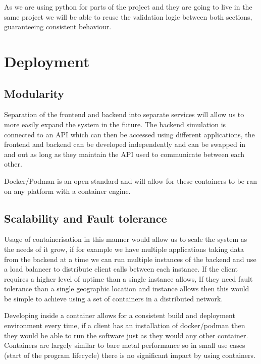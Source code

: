 \documentclass{article}
\begin{document}
As we are using python for parts of the project and they are going to live 
in the same project we will be able to reuse the validation logic between both 
sections, guaranteeing consistent behaviour.


\section{Deployment}

\subsection{Modularity}
Separation of the frontend and backend into separate services will allow us to more 
easily expand the system in the future. The backend simulation is connected to an API 
which can then be accessed using different applications, the frontend and backend can 
be developed independently and can be swapped in and out as long as they maintain the 
API used to communicate between each other.

Docker/Podman is an open standard and will allow for these containers to be ran 
on any platform with a container engine.

\subsection{Scalability and Fault tolerance}
Usage of containerisation in this manner would allow us to scale the system as the 
needs of it grow, if for example we have multiple applications taking data from the 
backend at a time we can run multiple instances of the backend and use a load balancer 
to distribute client calls between each instance. If the client requires a higher level 
of uptime than a single instance allows, If they need fault tolerance than a single 
geographic location and instance allows then this would be simple to achieve using a 
set of containers in a distributed network.

Developing inside a container allows for a consistent build and deployment environment 
every time, if a client has an installation of docker/podman then they would be able to 
run the software just as they would any other container. Containers are largely similar 
to bare metal performance so in small use cases (start of the program lifecycle) there 
is no significant impact by using containers.
\end{document}
